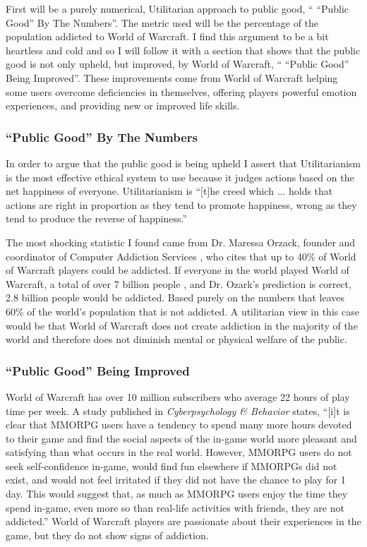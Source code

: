 \documentclass[11pt]{article}
\begin{document}
\begin{multicols}{2}
First will be a purely numerical, Utilitarian approach to public good, `` ``Public Good'' By The Numbers''. The metric used will be the percentage of the population addicted to World of Warcraft. I find this argument to be a bit heartless and cold and so I will follow it with a section that shows that the public good is not only upheld, but improved, by World of Warcraft, `` ``Public Good'' Being Improved''. These improvements come from World of Warcraft helping some users overcome deficiencies in themselves, offering players powerful emotion experiences, and providing new or improved life skills.

\subsubsection{``Public Good'' By The Numbers}
In order to argue that the public good is being upheld I assert that Utilitarianism is the most effective ethical system to use because it judges actions based on the net happiness of everyone. Utilitarianism is ``[t]he creed which ... holds that actions are right in proportion as they tend to promote happiness, wrong as they tend to produce the reverse of happiness.'' \cite{Utilitarianism}

The most shocking statistic I found came from Dr. Maressa Orzack, founder and coordinator of Computer Addiction Services \cite{CompAddictionServices}, who cites that up to 40\% of World of Warcraft players could be addicted. \cite{FortyPercentAddicted} If everyone in the world played World of Warcraft, a total of over 7 billion people \cite{WorldPopulation}, and Dr. Ozark's prediction is correct, 2.8 billion people would be addicted. Based purely on the numbers that leaves 60\% of the world's population that is not addicted. A utilitarian view in this case would be that World of Warcraft does not create addiction in the majority of the world and therefore does not diminish mental or physical welfare of the public.

\subsubsection{``Public Good'' Being Improved}
World of Warcraft has over 10 million subscribers \cite{WoWPlayerCount} who average 22 hours of play time per week. \cite{PlayerMotivations} A study published in \emph{Cyberpsychology \& Behavior} \cite{ExcessiveUseForSocialAspects} states, ``[i]t is clear that MMORPG users have a tendency to spend many more hours devoted to their game and find the social aspects of the in-game world more pleasant and satisfying than what occurs in the real world. However, MMORPG users do not seek self-confidence in-game, would find fun elsewhere if MMORPGs did not exist, and would not feel irritated if they did not have the chance to play for 1 day. This would suggest that, as much as MMORPG users enjoy the time they spend in-game, even more so than real-life activities with friends, they are not addicted.'' World of Warcraft players are passionate about their experiences in the game, but they do not show signs of addiction.


\end{multicols}
\end{document}
